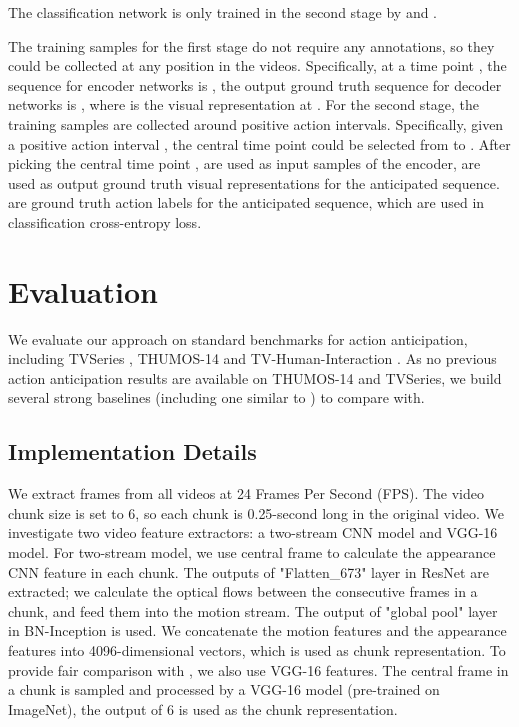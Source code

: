 \documentclass{bmvc2k}
\begin{document}
The classification network is only trained in the second stage by  and . 

The training samples for the first stage do not require any annotations, so they could be collected at any position in the videos. Specifically, at a time point , the sequence for encoder networks is , the output ground truth sequence for decoder networks is , where  is the visual representation at . For the second stage, the training samples are collected around positive action intervals. Specifically, given a positive action interval , the central time point  could be selected from  to . After picking the central time point ,  are used as input samples of the encoder,  are used as output ground truth visual representations for the anticipated sequence.  are ground truth action labels for the anticipated sequence, which are used in classification cross-entropy loss. 





\section{Evaluation}


We evaluate our approach on standard benchmarks for action anticipation, including TVSeries \cite{de2016online}, THUMOS-14 and TV-Human-Interaction \cite{patron2010high}. As no previous action anticipation results are available on THUMOS-14 and TVSeries, we build several strong baselines (including one similar to \cite{vondrick2016anticipating}) to compare with. \subsection{Implementation Details}

We extract frames from all videos at 24 Frames Per Second (FPS). The video chunk size is set to 6, so each chunk is 0.25-second long in the original video. We investigate two video feature extractors: a two-stream CNN model \cite{xiong2016cuhk} and VGG-16 \cite{simonyan2014very} model. For two-stream model, we use central frame to calculate the appearance CNN feature in each chunk. The outputs of  "Flatten\_673" layer in ResNet are extracted;  we calculate the optical flows \cite{farneback2003two} between the  consecutive frames in a chunk, and feed them into the motion stream. The output of "global pool" layer in BN-Inception \cite{ioffe2015batch} is used. We concatenate the motion features and the appearance features into 4096-dimensional vectors, which is used as chunk representation. To provide fair comparison with \cite{de2016online}, we also use VGG-16 features. The central frame in a chunk is sampled and processed by a VGG-16 model (pre-trained on ImageNet), the output of 6 is used as the chunk representation. 
\end{document}
